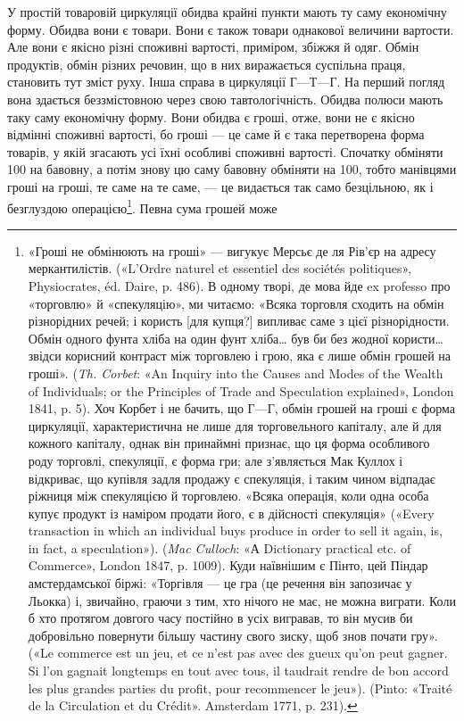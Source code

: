У простій товаровій циркуляції обидва крайні пункти мають
ту саму економічну форму. Обидва вони є товари. Вони є також
товари однакової величини вартости. Але вони є якісно різні
споживні вартості, приміром, збіжжя й одяг. Обмін продуктів,
обмін різних речовин, що в них виражається суспільна праця,
становить тут зміст руху. Інша справа в циркуляції $Г — Т — Г$.
На перший погляд вона здається беззмістовною через свою тавтологічність.
Обидва полюси мають таку саму економічну форму.
Вони обидва є гроші, отже, вони не є якісно відмінні споживні
вартості, бо гроші — це саме й є така перетворена форма товарів,
у якій згасають усі їхні особливі споживні вартості. Спочатку
обміняти 100 на бавовну, а потім знову цю саму
бавовну обміняти на 100, тобто манівцями
гроші на гроші, те саме на те саме, — це видається так само безцільною,
як і безглуздою операцією\footnote{
«Гроші не обмінюють на гроші» — вигукує Мерсьє де ля Рів’єр
на адресу меркантилістів. («L’Ordre naturel et essentiel des sociétés politiques»,
Physiocrates, éd. Daire, p. 486). В одному творі, де мова йде
ex professo про «торговлю» й «спекуляцію», ми читаємо: «Всяка торговля
сходить на обмін різнорідних речей; і користь [для купця?] випливає
саме з цієї різнорідности. Обмін одного фунта хліба на один фунт хліба\dots{}
був би без жодної користи\dots{} звідси корисний контраст між торговлею
і грою, яка є лише обмін грошей на гроші». (\emph{Th. Corbet}: «An Inquiry
into the Causes and Modes of the Wealth of Individuals; or the Principles
of Trade and Speculation explained», London 1841, p. 5). Хоч Корбет і не
бачить, що $Г — Г$, обмін грошей на гроші є форма циркуляції, характеристична
не лише для торговельного капіталу, але й для кожного капіталу,
однак він принаймні признає, що ця форма особливого роду торговлі,
спекуляції, є форма гри; але з’являється Мак Куллох і відкриває, що
\parbreak{}
купівля задля продажу є спекуляція, і таким чином відпадає ріжниця
між спекуляцією й торговлею. «Всяка операція, коли одна особа купує
продукт із наміром продати його, є в дійсності спекуляція» («Every
transaction in which an individual buys produce in order to sell it again,
is, in fact, a speculation»). (\emph{Mac Culloch}: «А Dictionary practical etc.
of Commerce», London 1847, p. 1009). Куди наївнішим є Пінто, цей Піндар
амстердамської біржі: «Торгівля — це гра (це речення він запозичає
у Льокка) і, звичайно, граючи з тим, хто нічого не має, не можна
виграти. Коли б хто протягом довгого часу постійно в усіх вигравав,
то він мусив би добровільно повернути більшу частину свого зиску,
щоб знов почати гру». («Le commerce est un jeu, et ce n’est pas avec des
gueux qu’on peut gagner. Si l’on gagnait longtemps en tout avec tous, il
taudrait rendre de bon accord les plus grandes parties du profit, pour
recommencer le jeu»). (Pinto: «Traité de la Circulation et du Crédit».
Amsterdam 1771, p. 231).
}. Певна сума грошей може
